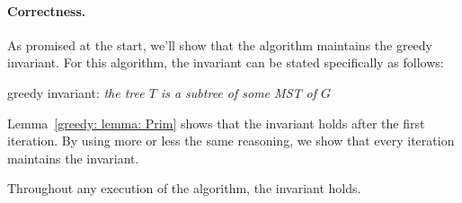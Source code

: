\paragraph{Correctness.}
As promised at the start, we'll show that the algorithm maintains the greedy invariant.
For this algorithm, the invariant can be stated specifically as follows:

\medskip 
\centerline{\textsf{greedy invariant}: \emph{the tree $T$ is a subtree of some MST of $G$}}
\medskip 

Lemma~\ref{greedy: lemma: Prim} shows that the invariant holds after the first iteration.
By using more or less the same reasoning, we show that every iteration maintains the invariant.

\begin{lemma}\label{greedy: invariant}
  Throughout any execution of the algorithm, the invariant holds.
\end{lemma}
